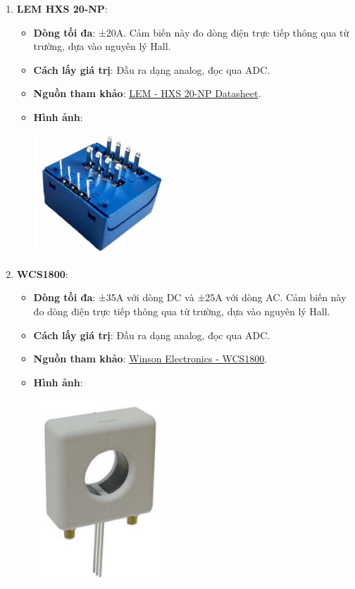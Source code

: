 \begin{enumerate}
    \item \textbf{LEM HXS 20-NP}:
    \begin{itemize}
        \item \textbf{Dòng tối đa}: ±20A. Cảm biến này đo dòng điện trực tiếp thông qua từ trường, dựa vào nguyên lý Hall.
        \item \textbf{Cách lấy giá trị}: Đầu ra dạng analog, đọc qua ADC.
        \item \textbf{Nguồn tham khảo}: \href{https://www.lem.com/sites/default/files/products_datasheets/hxs_20-np.pdf}{LEM - HXS 20-NP Datasheet}.
        \item \textbf{Hình ảnh}:
        \begin{center}
            \includegraphics[width=0.4\textwidth]{graphics/section5/lem_hxs20np.png}
        \end{center}
    \end{itemize}

    \item \textbf{WCS1800}:
    \begin{itemize}
        \item \textbf{Dòng tối đa}: ±35A với dòng DC và ±25A với dòng AC. Cảm biến này đo dòng điện trực tiếp thông qua từ trường, dựa vào nguyên lý Hall.
        \item \textbf{Cách lấy giá trị}: Đầu ra dạng analog, đọc qua ADC.
        \item \textbf{Nguồn tham khảo}: \href{https://www.winson.com.tw/uploads/images/WCS1800.pdf}{Winson Electronics - WCS1800}.
        \item \textbf{Hình ảnh}:
        \begin{center}
            \includegraphics[width=0.4\textwidth]{graphics/section5/wcs1800.png}
        \end{center}
    \end{itemize}

\end{enumerate}
\pagebreak
